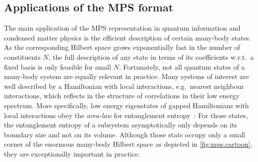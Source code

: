 \subsection{Applications of the MPS format}%
\label{sub:mps.applications}

\begin{figure*}[t]
  \centering
  \caption{\label{fig:mps.cartoon}%
    The manifold of quantum states with an efficient MPS description occupies only a tiny corner in the full Hilbert space.
  }
\end{figure*}

The main application of the MPS representation in quantum information and condensed matter physics is the efficient description of certain many-body states.
As the corresponding Hilbert space grows exponentially fast in the number of constituents $N$, the full description of any state in terms of its coefficients w.r.t.\ a fixed basis is only feasible for small $N$.
Fortunately, not all quantum states of a many-body system are equally relevant in practice.
Many systems of interest are well described by a Hamiltonian with local interactions, e.g.\ nearest neighbour interactions, which reflects in the structure of correlations in their low energy spectrum.
More specifically, low energy eigenstates of gapped Hamiltonians with local interactions obey the \emph{area-law} for entanglement entropy~\cite{Hastings_2006_Solving,Verstraete_2006_Matrix,Eisert_2010_Colloquium}:
For those states, the entanglement entropy of a subsystem asymptotically only depends on its boundary size and not on its volume.
Although those stats occupy only a small corner of the enormous many-body Hilbert space as depicted in \cref{fig:mps.cartoon}, they are exceptionally important in practice.

